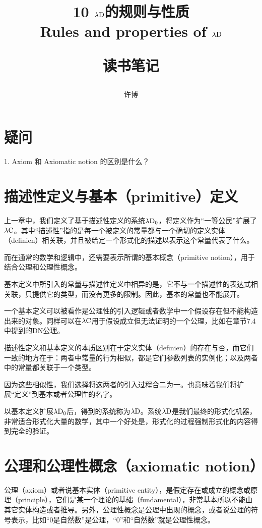 \documentclass[UTF8]{article}
\title{10 $\lambda{\rm D}$的规则与性质\\Rules and properties of $\lambda{\rm D}$\\[2ex]\begin{large}读书笔记\end{large}}
\author{许博}
\date{}
\begin{document}
\maketitle
	\section{疑问}
	
		1. Axiom 和 Axiomatic notion 的区别是什么？

	\section{描述性定义与基本（primitive）定义}
	\noindent
	上一章中，我们定义了基于描述性定义的系统$\lambda{\rm D_0}$，将定义作为“一等公民”扩展了$\lambda{\rm C}$。其中“描述性”指的是每一个被定义的常量都与一个确切的定义实体（definien）相关联，并且被给定一个形式化的描述以表示这个常量代表了什么。
	
		而在通常的数学和逻辑中，还需要表示所谓的基本概念（primitive  notion），用于结合公理和公理性概念。
		
		基本定义中所引入的常量与描述性定义中相异的是，它不与一个描述性的表达式相关联，只提供它的类型，而没有更多的限制。因此，基本的常量也不能展开。
		
		一个基本定义可以被看作是公理性的引入逻辑或者数学中一个假设存在但不能构造出来的对象。同样可以在$\lambda{\rm C}$用于假设成立但无法证明的一个公理，比如在章节7.4中提到的DN公理。
		
		描述性定义和基本定义的本质区别在于定义实体（definien）的存在与否，而它们一致的地方在于：两者中常量的行为相似，都是它们参数列表的实例化；以及两者中的常量都关联于一个类型。
		
		因为这些相似性，我们选择将这两者的引入过程合二为一。也意味着我们将扩展“定义”到基本或者公理性的名字。
		
		以基本定义扩展$\lambda{\rm D_0}$后，得到的系统称为$\lambda{\rm D}$。系统$\lambda{\rm D}$是我们最终的形式化机器，非常适合形式化大量的数学，其中一个好处是，形式化的过程强制形式化的内容得到完全的验证。
		
	\section{公理和公理性概念（axiomatic notion）}
	\noindent
	公理（axiom）或者说基本实体（primitive  entity），是假定存在或成立的概念或原理（principle），它们是某一个理论的基础（fundamental），非常基本所以不能由其它实体构造或者推导。另外，公理性概念是公理中出现的概念，或者说公理的符号表示，比如“0是自然数”是公理，“0”和“自然数”就是公理性概念。
	
\end{document}
